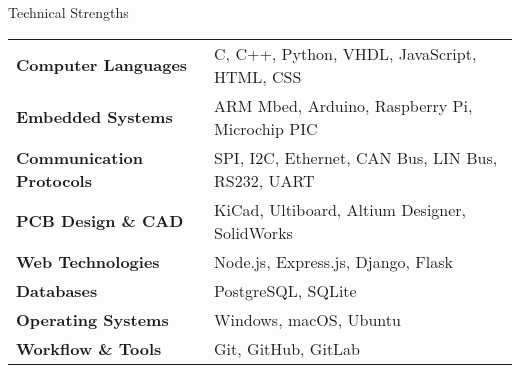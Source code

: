 \documentclass[
	10pt,
]{style} %
\begin{document}

\begin{rSection}{Technical Strengths}

	\begin{tabular}{@{} >{\bfseries}l @{\hspace{6ex}} l @{}}
		Computer Languages & C, C++, Python, VHDL, JavaScript, HTML, CSS \\
		Embedded Systems & ARM Mbed, Arduino, Raspberry Pi, Microchip PIC \\
		Communication Protocols & SPI, I2C, Ethernet, CAN Bus, LIN Bus, RS232, UART \\
		PCB Design \& CAD & KiCad, Ultiboard, Altium Designer, SolidWorks \\
		Web Technologies & Node.js, Express.js, Django, Flask \\
		Databases & PostgreSQL, SQLite \\
		Operating Systems & Windows, macOS, Ubuntu \\
		Workflow \& Tools & Git, GitHub, GitLab \\
	\end{tabular}
	

\end{rSection}
\end{document}
